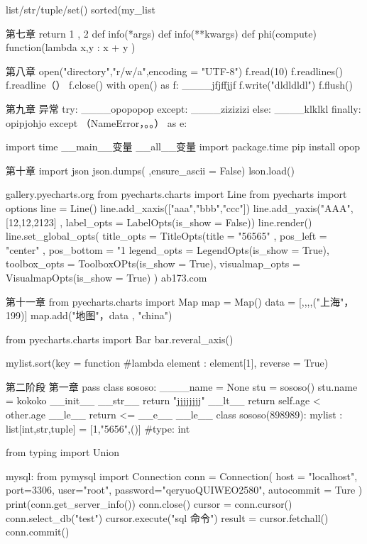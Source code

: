 list/str/tuple/set()  %
sorted(my_list%

第七章  
return 1 , 2
def info(*args) %
def info(**kwargs)  %
def phi(compute)   %
function(lambda x,y : x + y )  %

第八章
open("directory","r/w/a",encoding = "UTF-8")  %
f.read(10)  %
f.readlines()  %
f.readline（）  %
f.close()
with open() as f:  %
____jfjffjjf  
f.write("dldldldl")  %
f.flush()   %

第九章  异常
try:
____opopopop
except:
____zizizizi
else:
____klklkl
finally:
opipjohjo
except （NameError，。。） as e:  %

import time  %
__main__变量  %
__all__变量   %
import package.time
pip install opop 

第十章
import json
json.dumps(  ,ensure_ascii = False)  %
lson.load()  %

gallery.pyecharts.org   %
from pyecharts.charts import Line
from pyecharts import options
line = Line()
line.add_xaxis(["aaa","bbb","ccc"])
line.add_yaxis("AAA",[12,12,2123] , label_opts = LabelOpts(is_show = False))
line.render()
line.set_global_opts(
    title_opts = TitleOpts(title = "56565" , pos_left = "center" , pos_bottom = "1%
    legend_opts = LegendOpts(is_show = True),
    toolbox_opts = ToolboxOPts(is_show = True),
    visualmap_opts = VisualmapOpts(is_show = True)
)
ab173.com

第十一章
from pyecharts.charts import Map
map = Map()
data = [,,,,("上海"， 199)]
map.add("地图"，data , "china")

from pyecharts.charts import Bar
bar.reveral_axis()

mylist.sort(key = function #lambda element : element[1], reverse = True)

第二阶段   
第一章
pass
class sososo:   %
____name = None
stu = sososo()
stu.name = kokoko
 __init__
__str__    %
    return "jjjjjjjj"
__lt__
    return self.age < other.age
__le__
    return         <=
__e__
__le__
class sososo(898989):      %
mylist : list[int,str,tuple] = [1,"5656",()]   #type: int

from typing import Union %

mysql:
from pymysql import Connection
conn = Connection(
host = "localhost",
port=3306,
user="root",
password="qeryuoQUIWEO2580",
autocommit = Ture
)
print(conn.get_server_info())
conn.close()
cursor = conn.cursor()
conn.select_db("test")
cursor.execute("sql 命令")
result = cursor.fetchall()
conn.commit()


